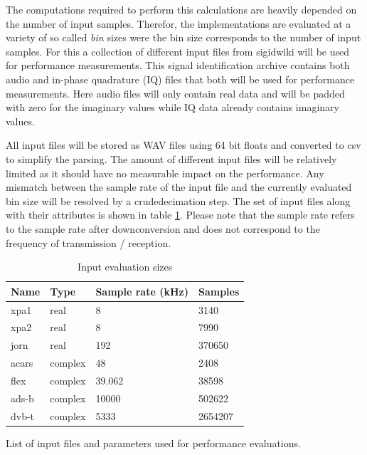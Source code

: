 \documentclass[conference]{IEEEtran}
\begin{document}
The computations required to perform this calculations are heavily depended
on the number of input samples. Therefor, the implementations are evaluated at
a variety of so called \textit{bin} sizes were the bin size corresponds to the
number of input samples. For this a collection of different input files from
sigidwiki\cite{sigidwiki} will be used for performance measurements. This
signal identification archive contains both audio and in-phase quadrature (IQ)
files that both will be used for performance measurements. Here audio files
will only contain real data and will be padded with zero for the imaginary
values while IQ data already contains imaginary values.

All input files will be stored as WAV files using 64 bit floats and converted
to csv to simplify the parsing. The amount of different input files will be
relatively limited as it should have no measurable impact on the performance.
Any mismatch between the sample rate of the input file and the currently
evaluated bin size will be resolved by a crude\footnotemark[9] decimation step.
The set of input files along with their attributes is shown in
table \ref{table:files}. Please note that the sample rate refers to the sample
rate after downconversion and does not correspond to the frequency of
transmission / reception.


\begin{table}[h!]
	\caption{Input evaluation sizes}
	\label{table:files}
	\centering
	\begin{adjustbox}{width=0.5\textwidth}
		\begin{threeparttable}[]
			\begin{tabular}{llll}
				\toprule 
				\textbf{Name} & \textbf{Type} & \textbf{Sample rate (kHz)} &
				\textbf{Samples} \\
				\midrule
				xpa1 & real & 8 & 3140 \\
				xpa2 & real & 8 & 7990 \\
				jorn & real & 192 & 370650 \\
				acars & complex & 48 & 2408 \\
				flex & complex & 39.062 & 38598 \\
				ads-b & complex & 10000 & 502622 \\
				dvb-t & complex & 5333 & 2654207 \\
				\bottomrule
			\end{tabular}
			\begin{tablenotes}
				\centering List of input files and parameters used for
				performance evaluations.
			\end{tablenotes}
		\end{threeparttable}
	\end{adjustbox}
\end{table}
\end{document}
